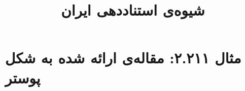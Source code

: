 \documentclass[a4paper,10pt]{article}
\begin{document}
\title{شیوه‌ی استناددهی ایران
 }
\author{}
\date{}
\maketitle



\section*{مثال ۲.۲۱۱: مقاله‌ی ارائه شده به شکل پوستر}

\cite{دالمن1384}\\
\cite{ferguson1999}\\






\end{document}
